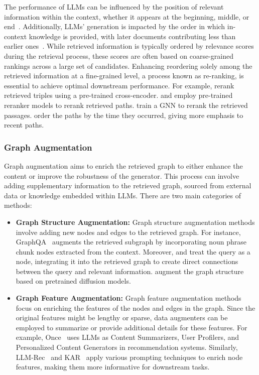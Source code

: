The performance of LLMs can be influenced by the position of relevant information within the context, whether it appears at the beginning, middle, or end~\cite{chen2023understanding}. Additionally, LLMs' generation is impacted by the order in which in-context knowledge is provided, with later documents contributing less than earlier ones~\cite{ivgi2023efficient, liu2024lost}. While retrieved information is typically ordered by relevance scores during the retrieval process, these scores are often based on coarse-grained rankings across a large set of candidates. Enhancing reordering solely among the retrieved information at a fine-grained level, a process known as re-ranking, is essential to achieve optimal downstream performance. For example, \citet{li2023graph} rerank retrieved triples using a pre-trained cross-encoder. \citet{jiang2024hykge} and \citet{liu2024knowledge} employ pre-trained reranker models to rerank retrieved paths. \citet{yu2021kg} train a GNN to rerank the retrieved passages.  \citet{liao2024gentkg} order the paths by the time they occurred, giving more emphasis to recent paths. 

\subsubsection{Graph Augmentation}
Graph augmentation aims to enrich the retrieved graph to either enhance the content or improve the robustness of the generator. This process can involve adding supplementary information to the retrieved graph, sourced from external data or knowledge embedded within LLMs.  There are two main categories of methods:
\begin{itemize}[leftmargin=*]
    \item \textbf{Graph Structure Augmentation:} Graph structure augmentation methods involve adding new nodes and edges to the retrieved graph. For instance, GraphQA~\cite{taunk2023grapeqa} augments the retrieved subgraph by incorporating noun phrase chunk nodes extracted from the context. Moreover, \citet{yasunaga2021qa} and \citet{taunk2023grapeqa} treat the query as a node, integrating it into the retrieved graph to create direct connections between the query and relevant information. \citet{tang2024cross} augment the graph structure based on pretrained diffusion models. 
    \item \textbf{Graph Feature Augmentation:} Graph feature augmentation methods focus on enriching the features of the nodes and edges in the graph. Since the original features might be lengthy or sparse, data augmenters can be employed to summarize or provide additional details for these features. For example, Once~\cite{liu2024once} uses LLMs as Content Summarizers, User Profilers, and Personalized Content Generators in recommendation systems. Similarly, LLM-Rec~\cite{lyu2023llm} and KAR~\cite{xi2024towards} apply various prompting techniques to enrich node features, making them more informative for downstream tasks.
\end{itemize}

